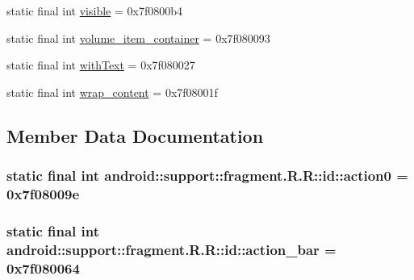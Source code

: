 \begin{CompactItemize}
\item 
static final int \hyperlink{classandroid_1_1support_1_1fragment_1_1_r_1_1id_90f05b01648a2b27fbe9ef8eca771162}{visible} = 0x7f0800b4
\item 
static final int \hyperlink{classandroid_1_1support_1_1fragment_1_1_r_1_1id_02d1c175a8aa5751b6aa445c5677aaf8}{volume\_\-item\_\-container} = 0x7f080093
\item 
static final int \hyperlink{classandroid_1_1support_1_1fragment_1_1_r_1_1id_b3966dca73383e525d1fc20386969a27}{withText} = 0x7f080027
\item 
static final int \hyperlink{classandroid_1_1support_1_1fragment_1_1_r_1_1id_dd17ac50a512e7583b19e59c4cd2fd16}{wrap\_\-content} = 0x7f08001f
\end{CompactItemize}


\subsection{Member Data Documentation}
\hypertarget{classandroid_1_1support_1_1fragment_1_1_r_1_1id_8768c2d6a2ef0f8ac9ca56da079d671c}{
\subsubsection[{action0}]{\setlength{\rightskip}{0pt plus 5cm}static final int android::support::fragment.R.R::id::action0 = 0x7f08009e}}
\label{classandroid_1_1support_1_1fragment_1_1_r_1_1id_8768c2d6a2ef0f8ac9ca56da079d671c}


\hypertarget{classandroid_1_1support_1_1fragment_1_1_r_1_1id_61432839d3f52709b27cc385cb9106c8}{
\subsubsection[{action\_\-bar}]{\setlength{\rightskip}{0pt plus 5cm}static final int android::support::fragment.R.R::id::action\_\-bar = 0x7f080064}}
\label{classandroid_1_1support_1_1fragment_1_1_r_1_1id_61432839d3f52709b27cc385cb9106c8}


